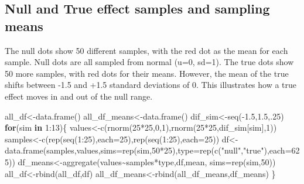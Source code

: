 \documentclass[
  letterpaper,
  DIV=11,
  numbers=noendperiod]{scrreprt}
\newenvironment{Shaded}{\begin{snugshade}}{\end{snugshade}}
\newcommand{\AttributeTok}[1]{\textcolor[rgb]{0.40,0.45,0.13}{#1}}
\newcommand{\ControlFlowTok}[1]{\textcolor[rgb]{0.00,0.23,0.31}{\textbf{#1}}}
\newcommand{\DecValTok}[1]{\textcolor[rgb]{0.68,0.00,0.00}{#1}}
\newcommand{\FloatTok}[1]{\textcolor[rgb]{0.68,0.00,0.00}{#1}}
\newcommand{\FunctionTok}[1]{\textcolor[rgb]{0.28,0.35,0.67}{#1}}
\newcommand{\NormalTok}[1]{\textcolor[rgb]{0.00,0.23,0.31}{#1}}
\newcommand{\OtherTok}[1]{\textcolor[rgb]{0.00,0.23,0.31}{#1}}
\newcommand{\SpecialCharTok}[1]{\textcolor[rgb]{0.37,0.37,0.37}{#1}}
\newcommand{\StringTok}[1]{\textcolor[rgb]{0.13,0.47,0.30}{#1}}
\begin{document}
\subsection{Null and True effect samples and sampling
means}\label{null-and-true-effect-samples-and-sampling-means}

The null dots show 50 different samples, with the red dot as the mean
for each sample. Null dots are all sampled from normal (u=0, sd=1). The
true dots show 50 more samples, with red dots for their means. However,
the mean of the true shifts between -1.5 and +1.5 standard deviations of
0. This illustrates how a true effect moves in and out of the null
range.

\begin{Shaded}
\begin{Highlighting}[]
\NormalTok{all\_df}\OtherTok{\textless{}{-}}\FunctionTok{data.frame}\NormalTok{()}
\NormalTok{all\_df\_means}\OtherTok{\textless{}{-}}\FunctionTok{data.frame}\NormalTok{()}
\NormalTok{dif\_sim}\OtherTok{\textless{}{-}}\FunctionTok{seq}\NormalTok{(}\SpecialCharTok{{-}}\FloatTok{1.5}\NormalTok{,}\FloatTok{1.5}\NormalTok{,.}\DecValTok{25}\NormalTok{)}
\ControlFlowTok{for}\NormalTok{(sim }\ControlFlowTok{in} \DecValTok{1}\SpecialCharTok{:}\DecValTok{13}\NormalTok{)\{}
\NormalTok{  values}\OtherTok{\textless{}{-}}\FunctionTok{c}\NormalTok{(}\FunctionTok{rnorm}\NormalTok{(}\DecValTok{25}\SpecialCharTok{*}\DecValTok{25}\NormalTok{,}\DecValTok{0}\NormalTok{,}\DecValTok{1}\NormalTok{),}\FunctionTok{rnorm}\NormalTok{(}\DecValTok{25}\SpecialCharTok{*}\DecValTok{25}\NormalTok{,dif\_sim[sim],}\DecValTok{1}\NormalTok{))}
\NormalTok{  samples}\OtherTok{\textless{}{-}}\FunctionTok{c}\NormalTok{(}\FunctionTok{rep}\NormalTok{(}\FunctionTok{seq}\NormalTok{(}\DecValTok{1}\SpecialCharTok{:}\DecValTok{25}\NormalTok{),}\AttributeTok{each=}\DecValTok{25}\NormalTok{),}\FunctionTok{rep}\NormalTok{(}\FunctionTok{seq}\NormalTok{(}\DecValTok{1}\SpecialCharTok{:}\DecValTok{25}\NormalTok{),}\AttributeTok{each=}\DecValTok{25}\NormalTok{))}
\NormalTok{  df}\OtherTok{\textless{}{-}}\FunctionTok{data.frame}\NormalTok{(samples,values,}\AttributeTok{sims=}\FunctionTok{rep}\NormalTok{(sim,}\DecValTok{50}\SpecialCharTok{*}\DecValTok{25}\NormalTok{),}\AttributeTok{type=}\FunctionTok{rep}\NormalTok{(}\FunctionTok{c}\NormalTok{(}\StringTok{"null"}\NormalTok{,}\StringTok{"true"}\NormalTok{),}\AttributeTok{each=}\DecValTok{625}\NormalTok{))}
\NormalTok{  df\_means}\OtherTok{\textless{}{-}}\FunctionTok{aggregate}\NormalTok{(values}\SpecialCharTok{\textasciitilde{}}\NormalTok{samples}\SpecialCharTok{*}\NormalTok{type,df,mean, }\AttributeTok{sims=}\FunctionTok{rep}\NormalTok{(sim,}\DecValTok{50}\NormalTok{))}
\NormalTok{  all\_df}\OtherTok{\textless{}{-}}\FunctionTok{rbind}\NormalTok{(all\_df,df)}
\NormalTok{  all\_df\_means}\OtherTok{\textless{}{-}}\FunctionTok{rbind}\NormalTok{(all\_df\_means,df\_means)}
\NormalTok{\}}


\end{Highlighting}
\end{Shaded}
\end{document}
